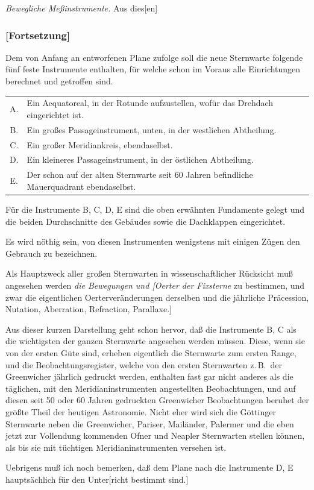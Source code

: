 \documentclass[12pt,a4paper]{article}
\theoremstyle{plain}
\theoremstyle{definition}
\theoremstyle{remark}
\begin{document}
\textit{Bewegliche Meßinstrumente.} Aus dies[en]

\newpage
\subsubsection*{[Fortsetzung]}

Dem von Anfang an entworfenen Plane zufolge soll die neue Sternwarte folgende fünf feste Instrumente enthalten, für welche schon im Voraus alle Einrichtungen berechnet und getroffen sind.

\begin{center}
\begin{tabular}{cp{10cm}}
A. & Ein Aequatoreal, in der Rotunde aufzustellen, wofür das Drehdach eingerichtet ist. \\
B. & Ein großes Passageinstrument, unten, in der westlichen Abtheilung. \\
C. & Ein großer Meridiankreis, ebendaselbst. \\
D. & Ein kleineres Passageinstrument, in der östlichen Abtheilung. \\
E. & Der schon auf der alten Sternwarte seit 60 Jahren befindliche Mauerquadrant ebendaselbst.
\end{tabular}
\end{center}

Für die Instrumente B, C, D, E sind die oben erwähnten Fundamente gelegt und die beiden Durchschnitte des Gebäudes sowie die Dachklappen eingerichtet.

Es wird nöthig sein, von diesen Instrumenten wenigstens mit einigen Zügen den Gebrauch zu bezeichnen.

Als Hauptzweck aller großen Sternwarten in wissenschaftlicher Rücksicht muß angesehen werden \textit{die Bewegungen und [Oerter der Fixsterne} zu bestimmen, und zwar die eigentlichen Oerterveränderungen derselben und die jährliche Präcession, Nutation, Aberration, Refraction, Parallaxe.]

\vspace{0.5em}
Aus dieser kurzen Darstellung geht schon hervor, daß die Instrumente B, C als die wichtigsten der ganzen Sternwarte angesehen werden müssen. Diese, wenn sie von der ersten Güte sind, erheben eigentlich die Sternwarte zum ersten Range, und die Beobachtungsregister, welche von den ersten Sternwarten z.\,B.\ der Greenwicher jährlich gedruckt werden, enthalten fast gar nicht anderes als die täglichen, mit den Meridianinstrumenten angestellten Beobachtungen, und auf diesen seit 50 oder 60 Jahren gedruckten Greenwicher Beobachtungen beruhet der größte Theil der heutigen Astronomie. Nicht eher wird sich die Göttinger Sternwarte neben die Greenwicher, Pariser, Mailänder, Palermer und die eben jetzt zur Vollendung kommenden Ofner und Neapler Sternwarten stellen können, als bis sie mit tüchtigen Meridianinstrumenten versehen ist.

Uebrigens muß ich noch bemerken, daß dem Plane nach die Instrumente D, E hauptsächlich für den Unter[richt bestimmt sind.]
\end{document}
